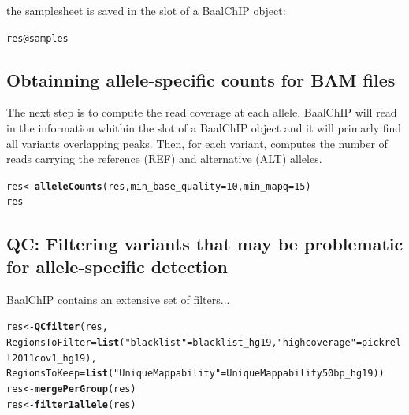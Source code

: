 \documentclass{article}\usepackage[]{graphicx}\usepackage[usenames,dvipsnames]{color}
\makeatletter
\newcommand{\hlnum}[1]{\textcolor[rgb]{0.686,0.059,0.569}{#1}}%
\newcommand{\hlstr}[1]{\textcolor[rgb]{0.192,0.494,0.8}{#1}}%
\newcommand{\hlopt}[1]{\textcolor[rgb]{0,0,0}{#1}}%
\newcommand{\hlstd}[1]{\textcolor[rgb]{0.345,0.345,0.345}{#1}}%
\newcommand{\hlkwb}[1]{\textcolor[rgb]{0.69,0.353,0.396}{#1}}%
\newcommand{\hlkwc}[1]{\textcolor[rgb]{0.333,0.667,0.333}{#1}}%
\newcommand{\hlkwd}[1]{\textcolor[rgb]{0.737,0.353,0.396}{\textbf{#1}}}%
\newenvironment{kframe}{%
 \def\at@end@of@kframe{}%
 \ifinner\ifhmode%
  \def\at@end@of@kframe{\end{minipage}}%
  \begin{minipage}{\columnwidth}%
 \fi\fi%
 \def\FrameCommand##1{\hskip\@totalleftmargin \hskip-\fboxsep
 \colorbox{shadecolor}{##1}\hskip-\fboxsep
     \hskip-\linewidth \hskip-\@totalleftmargin \hskip\columnwidth}%
 \MakeFramed {\advance\hsize-\width
   \@totalleftmargin\z@ \linewidth\hsize
   \@setminipage}}%
 {\par\unskip\endMakeFramed%
 \at@end@of@kframe}
\newenvironment{knitrout}{}{} %
\makeatother
\begin{document}
the samplesheet is saved in the  slot of a BaalChIP object:

\begin{knitrout}
\color{fgcolor}\begin{kframe}
\begin{alltt}
\hlstd{res}\hlopt{@}\hlkwc{samples}
\end{alltt}
\end{kframe}
\end{knitrout}

\subsection{Obtainning allele-specific counts for BAM files}

The next step is to compute the read coverage at each allele. BaalChIP will read in the information whithin the  slot of a BaalChIP object and it will primarly find all variants overlapping peaks. Then, for each variant, computes the number of reads carrying the reference (REF) and alternative (ALT) alleles.

\begin{knitrout}
\color{fgcolor}\begin{kframe}
\begin{alltt}
\hlstd{res} \hlkwb{<-} \hlkwd{alleleCounts}\hlstd{(res,} \hlkwc{min_base_quality}\hlstd{=}\hlnum{10}\hlstd{,} \hlkwc{min_mapq}\hlstd{=}\hlnum{15}\hlstd{)}
\hlstd{res}
\end{alltt}
\end{kframe}
\end{knitrout}

\subsection{QC: Filtering variants that may be problematic for allele-specific detection}

BaalChIP contains an extensive set of filters...

\begin{knitrout}
\color{fgcolor}\begin{kframe}
\begin{alltt}
\hlstd{res} \hlkwb{<-} \hlkwd{QCfilter}\hlstd{(res,}
                \hlkwc{RegionsToFilter}\hlstd{=}\hlkwd{list}\hlstd{(}\hlstr{"blacklist"}\hlstd{=blacklist_hg19,} \hlstr{"highcoverage"}\hlstd{=pickrell2011cov1_hg19),}
                \hlkwc{RegionsToKeep}\hlstd{=}\hlkwd{list}\hlstd{(}\hlstr{"UniqueMappability"}\hlstd{=UniqueMappability50bp_hg19))}
\hlstd{res} \hlkwb{<-} \hlkwd{mergePerGroup}\hlstd{(res)}
\hlstd{res} \hlkwb{<-} \hlkwd{filter1allele}\hlstd{(res)}
\end{alltt}
\end{kframe}
\end{knitrout}
\end{document}
